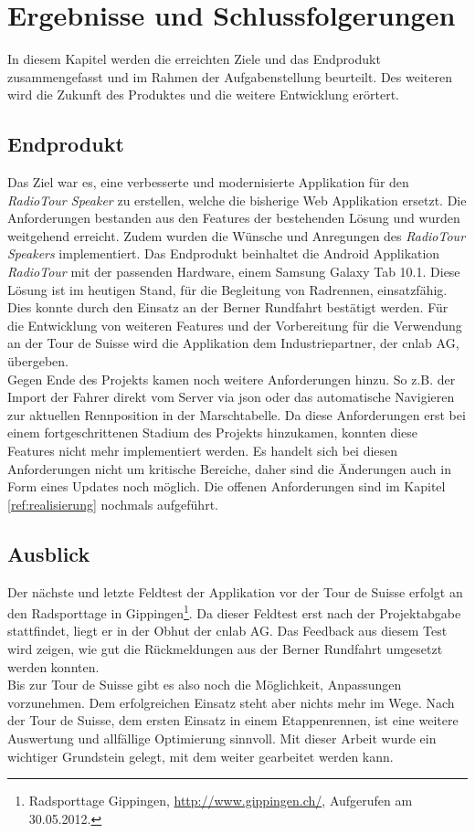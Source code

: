 \chapter{Ergebnisse und Schlussfolgerungen}
In diesem Kapitel werden die erreichten Ziele und das Endprodukt zusammengefasst und im Rahmen der Aufgabenstellung beurteilt. Des weiteren wird die Zukunft des Produktes und die weitere Entwicklung erörtert.

\section{Endprodukt}
Das Ziel war es, eine verbesserte und modernisierte Applikation für den \textit{RadioTour Speaker} zu erstellen, welche die bisherige Web Applikation ersetzt. Die Anforderungen bestanden aus den Features der bestehenden Lösung und wurden weitgehend erreicht. Zudem wurden die Wünsche und Anregungen des \textit{RadioTour Speakers} implementiert. Das Endprodukt beinhaltet die Android Applikation \textit{RadioTour} mit der passenden Hardware, einem Samsung Galaxy Tab 10.1. Diese Lösung ist im heutigen Stand, für die Begleitung von  Radrennen, einsatzfähig. Dies konnte durch den Einsatz an der Berner Rundfahrt bestätigt werden. Für die Entwicklung von weiteren Features und der Vorbereitung für die Verwendung an der Tour de Suisse wird die Applikation dem Industriepartner, der cnlab AG, übergeben.
\\

Gegen Ende des Projekts kamen noch weitere Anforderungen hinzu. 
So z.B. der Import der Fahrer direkt vom Server via \gls{json} oder das automatische Navigieren zur aktuellen Rennposition in der Marschtabelle. Da diese Anforderungen erst bei einem fortgeschrittenen Stadium des Projekts hinzukamen, konnten diese Features nicht mehr implementiert werden. Es handelt sich bei diesen Anforderungen nicht um kritische Bereiche, daher sind die Änderungen auch in Form eines Updates noch möglich. Die offenen Anforderungen sind im Kapitel \ref{ref:realisierung} nochmals aufgeführt.

\section{Ausblick}
Der nächste und letzte Feldtest der Applikation vor der Tour de Suisse erfolgt an den Radsporttage in Gippingen\footnote{Radsporttage Gippingen, \url{http://www.gippingen.ch/}, Aufgerufen am 30.05.2012.}. Da dieser Feldtest erst nach der Projektabgabe stattfindet, liegt er in der Obhut der cnlab AG. Das Feedback aus diesem Test wird zeigen, wie gut die Rückmeldungen aus der Berner Rundfahrt umgesetzt werden konnten.
\\

Bis zur Tour de Suisse gibt es also noch die Möglichkeit, Anpassungen vorzunehmen. Dem erfolgreichen Einsatz steht aber nichts mehr im Wege. Nach der Tour de Suisse, dem ersten Einsatz in einem Etappenrennen, ist eine weitere Auswertung und allfällige Optimierung sinnvoll. Mit dieser Arbeit wurde ein wichtiger Grundstein gelegt, mit dem weiter gearbeitet werden kann.